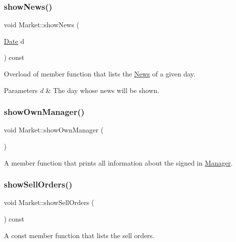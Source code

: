\subsubsection{\texorpdfstring{show\+News()}{showNews()}\hspace{0.1cm}{\footnotesize\ttfamily [4/4]}}
{\footnotesize\ttfamily void Market\+::show\+News (\begin{DoxyParamCaption}\item[{\hyperlink{class_date}{Date}}]{d }\end{DoxyParamCaption}) const}

Overload of member function that lists the \hyperlink{class_news}{News} of a given day. 
\begin{DoxyParams}{Parameters}
{\em d} & The day whose news will be shown. \\
\hline
\end{DoxyParams}
\hypertarget{class_market_adc76de7d85e9b35b082b0c710de5ce0b}{}\label{class_market_adc76de7d85e9b35b082b0c710de5ce0b} 
\subsubsection{\texorpdfstring{show\+Own\+Manager()}{showOwnManager()}}
{\footnotesize\ttfamily void Market\+::show\+Own\+Manager (\begin{DoxyParamCaption}{ }\end{DoxyParamCaption})}

A member function that prints all information about the signed in \hyperlink{class_manager}{Manager}. \hypertarget{class_market_aecbdf10d55744d01d95eba5027b671e0}{}\label{class_market_aecbdf10d55744d01d95eba5027b671e0} 
\subsubsection{\texorpdfstring{show\+Sell\+Orders()}{showSellOrders()}}
{\footnotesize\ttfamily void Market\+::show\+Sell\+Orders (\begin{DoxyParamCaption}{ }\end{DoxyParamCaption}) const}

A const member function that lists the sell orders. \hypertarget{class_market_a64150295ef3217f7ca581126b0f97c59}{}\label{class_market_a64150295ef3217f7ca581126b0f97c59} 
